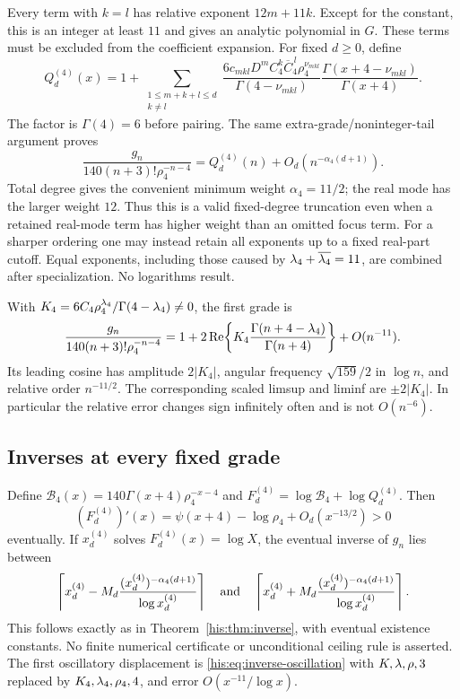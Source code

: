 Every term with $k=l$ has relative exponent $12m+11k$. Except for the constant, this is an integer at least $11$ and gives an analytic polynomial in $G$. These terms must be excluded from the coefficient expansion. For fixed $d\ge0$, define
\begin{equation}\label{his:eq:r4Q}
 Q^{(4)}_d(x)=1+
 \sum_{\substack{1\le m+k+l\le d\\k\ne l}}
 \frac{6c_{mkl}D^mC_4^k\overline C_4^{\,l}\rho_4^{\nu_{mkl}}}
      {\Gamma(4-\nu_{mkl})}
 \frac{\Gamma(x+4-\nu_{mkl})}{\Gamma(x+4)}.
\end{equation}
The factor is $\Gamma(4)=6$ before pairing. The same extra-grade/noninteger-tail argument proves
\begin{equation}\label{his:eq:r4allgrades}
 \frac{g_n}{140(n+3)!\rho_4^{-n-4}}
 =Q^{(4)}_d(n)+O_d(n^{-\alpha_4(d+1)}).
\end{equation}
Total degree gives the convenient minimum weight $\alpha_4=11/2$; the real mode has the larger weight $12$. Thus this is a valid fixed-degree truncation even when a retained real-mode term has higher weight than an omitted focus term. For a sharper ordering one may instead retain all exponents up to a fixed real-part cutoff. Equal exponents, including those caused by $\lambda_4+\overline{\lambda_4}=11$, are combined after specialization. No logarithms result.

With $K_4=6C_4\rho_4^{\lambda_4}/\Gamma(4-\lambda_4)\ne0$, the first grade is
\begin{equation}\label{his:eq:r4first}
 \frac{g_n}{140(n+3)!\rho_4^{-n-4}}
 =1+2\operatorname{Re}\!\left\{K_4\frac{\Gamma(n+4-\lambda_4)}{\Gamma(n+4)}\right\}
   +O(n^{-11}).
\end{equation}
Its leading cosine has amplitude $2|K_4|$, angular frequency $\sqrt{159}/2$ in $\log n$, and relative order $n^{-11/2}$. The corresponding scaled limsup and liminf are $\pm2|K_4|$. In particular the relative error changes sign infinitely often and is not $O(n^{-6})$.

\subsection{Inverses at every fixed grade}\label{his:sec:r4inverse}
Define $\mathcal B_4(x)=140\Gamma(x+4)\rho_4^{-x-4}$ and
$F^{(4)}_d=\log\mathcal B_4+\log Q^{(4)}_d$. Then
\[
 (F^{(4)}_d)'(x)=\psi(x+4)-\log\rho_4+O_d(x^{-13/2})>0
\]
eventually. If $x^{(4)}_d$ solves $F^{(4)}_d(x)=\log X$, the eventual inverse of $g_n$ lies between
\[
 \left\lceil x^{(4)}_d-M_d\frac{(x^{(4)}_d)^{-\alpha_4(d+1)}}{\log x^{(4)}_d}\right\rceil
 \quad\hbox{and}\quad
 \left\lceil x^{(4)}_d+M_d\frac{(x^{(4)}_d)^{-\alpha_4(d+1)}}{\log x^{(4)}_d}\right\rceil.
\]
This follows exactly as in Theorem~\ref{his:thm:inverse}, with eventual existence constants. No finite numerical certificate or unconditional ceiling rule is asserted. The first oscillatory displacement is \eqref{his:eq:inverse-oscillation} with $K,\lambda,\rho,3$ replaced by $K_4,\lambda_4,\rho_4,4$, and error $O(x^{-11}/\log x)$.

